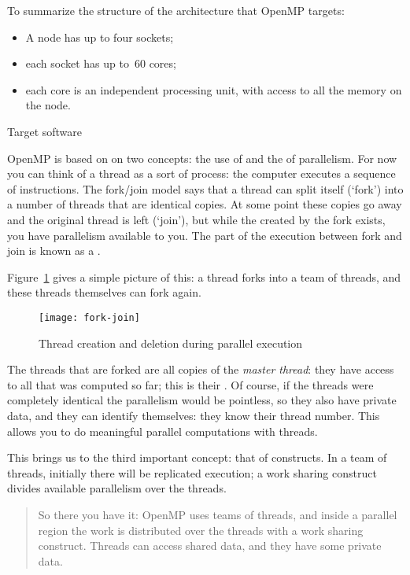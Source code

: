 To summarize the structure of the architecture that OpenMP targets:
\begin{itemize}
\item A node has up to four sockets;
\item each socket has up to~60 cores;
\item each core is an independent processing unit, with access to all
  the memory on the node.
\end{itemize}

 {Target software}

OpenMP is based on on two concepts: the use of 
and the  of
parallelism. For now you can think of a thread as a sort of process:
the computer executes a sequence of instructions.
The fork/join model says that a thread can split itself (`fork')
into a number of threads that are identical copies. At some point
these copies go away and the original thread is left (`join'),
but while the  created by the fork exists,
you have parallelism available to you. The part of the execution
between fork and join is known as a .

Figure~\ref{fig:forkjoin} gives a simple picture of this:
a thread forks into a team of threads, and these threads
themselves can fork again.
\begin{figure}[ht]
\texttt{[image: fork-join]}
\caption{Thread creation and deletion during parallel execution}
\label{fig:forkjoin}
\end{figure}

The threads that are forked are all copies of the
\emph{master thread}: they have access to all that was
computed so far; this is their .  Of course, if
the threads were completely identical the parallelism would be
pointless, so they also have private data, and they can identify
themselves: they know their thread number.  This allows you to do
meaningful parallel computations with threads.

This brings us to the third important concept: that of 
constructs. In a team of threads, initially there will be replicated execution;
a work sharing construct divides available parallelism over the threads.

\begin{quote}
  So there you have it: OpenMP uses teams of threads, and inside
  a parallel region the work is distributed over the threads with a work sharing construct.
  Threads can access shared data, and they have some private data.
\end{quote}

